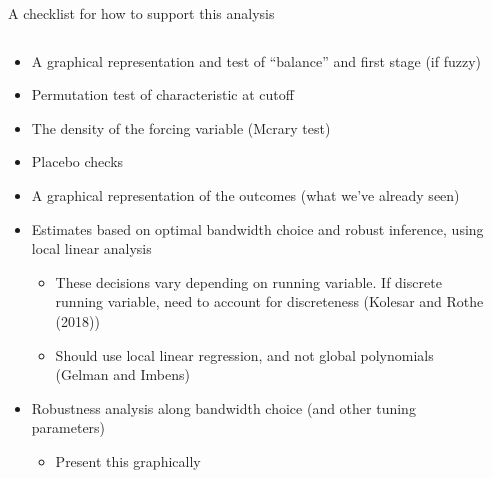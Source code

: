 \documentclass[notes,11pt, aspectratio=169]{beamer}
\begin{document}
\begin{frame}{A checklist for how to support this analysis}
    \begin{columns}[onlytextwidth, T] %
      \begin{column}{.9\textwidth}
        \begin{itemize}
        \item A graphical representation and test of ``balance'' and first stage (if fuzzy)
        \item Permutation test of characteristic at cutoff 
        \item The density of the forcing variable (Mcrary test)
        \item Placebo checks
        \item A graphical representation of the outcomes (what we've already seen)          
        \item Estimates based on optimal bandwidth choice and robust
          inference, using local linear analysis
          \begin{itemize}
          \item These decisions vary depending on running variable. If
            discrete running variable, need to account for
            discreteness (Kolesar and Rothe (2018))
          \item Should use local linear regression, and not global polynomials (Gelman and Imbens)
          \end{itemize}
        \item Robustness analysis along bandwidth choice (and other tuning parameters)
          \begin{itemize}
          \item Present this graphically
          \end{itemize}
        \end{itemize}
      \end{column}%
      \hfill%
      \begin{column}{.3\textwidth}
      \end{column}%
    \end{columns}
\end{frame}
\end{document}
